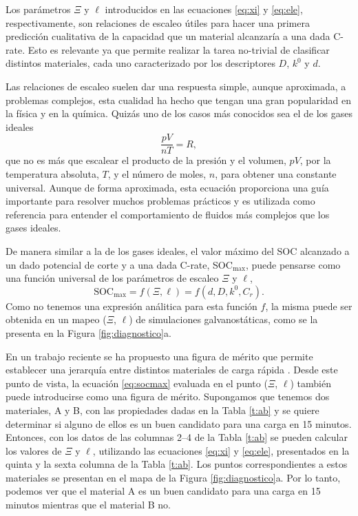 Los parámetros $\Xi$ y $\ell$ introducidos en las ecuaciones \ref{eq:xi} y 
\ref{eq:ele}, respectivamente, son relaciones de escaleo útiles para hacer una
primera predicción cualitativa de la capacidad que un material alcanzaría a una
dada C-rate. Esto es relevante ya que permite realizar la tarea no-trivial de
clasificar distintos materiales, cada uno caracterizado por los descriptores $D$,
$k^0$ y $d$.

Las relaciones de escaleo suelen dar una respuesta simple, aunque aproximada, a 
problemas complejos, esta cualidad ha hecho que tengan una gran popularidad 
en la física y en la química. Quizás uno de los casos más conocidos sea el de los
gases ideales
\begin{equation}
    \frac{p V}{n T} = R,
\end{equation}
que no es más que escalear el producto de la presión y el volumen, $p V$, por la
temperatura absoluta, $T$, y el número de moles, $n$, para obtener una constante
universal. Aunque de forma aproximada, esta ecuación proporciona una guía 
importante para resolver muchos problemas prácticos y es utilizada como referencia
para entender el comportamiento de fluidos más complejos que los gases ideales.

De manera similar a la de los gases ideales, el valor máximo del SOC alcanzado a 
un dado potencial de corte y a una dada C-rate, SOC$_{\max}$, puede 
pensarse como una función universal de los parámetros de escaleo $\Xi$ y $\ell$,
\begin{equation}\label{eq:socmax}
    \text{SOC}_{\max} = f(\Xi, \ell) = f(d, D, k^0, C_r).
\end{equation}
Como no tenemos una expresión análitica para esta función $f$, la misma puede ser 
obtenida en un mapeo ($\Xi$, $\ell$) de simulaciones galvanostáticas, como se la 
presenta en la Figura \ref{fig:diagnostico}a.

En un trabajo reciente se ha propuesto una figura de mérito que permite establecer 
una jerarquía entre distintos materiales de carga rápida \cite{xia2022}. Desde
este punto de vista, la ecuación \ref{eq:socmax} evaluada en el punto ($\Xi$, 
$\ell$) también puede introducirse como una figura de mérito. Supongamos que 
tenemos dos materiales, A y B, con las propiedades dadas en la Tabla \ref{t:ab} y 
se quiere determinar si alguno de ellos es un buen candidato para una carga en 15 
minutos. Entonces, con los datos de las columnas 2--4 de la Tabla \ref{t:ab} 
se pueden calcular los valores de $\Xi$ y $\ell$, utilizando las ecuaciones 
\ref{eq:xi} y \ref{eq:ele}, presentados en la quinta y la sexta columna de la 
Tabla \ref{t:ab}. Los puntos correspondientes a estos materiales se presentan en 
el mapa de la Figura \ref{fig:diagnostico}a. Por lo tanto, podemos ver que el 
material A es un buen candidato para una carga en 15 minutos mientras que el 
material B no.

